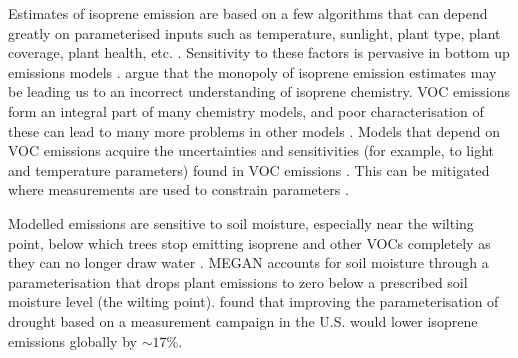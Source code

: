       Estimates of isoprene emission are based on a few algorithms that can depend greatly on parameterised inputs such as temperature, sunlight, plant type, plant coverage, plant health, etc. \parencite{Arneth2008,Niinemets2010}.
      Sensitivity to these factors is pervasive in bottom up emissions models 
      \parencite[e.g.,][]{Marais2014,Miller2014,Messina2016}.
      \textcite{Arneth2008} argue that the monopoly of isoprene emission estimates may be leading us to an incorrect understanding of isoprene chemistry.
      VOC emissions form an integral part of many chemistry models, and poor characterisation of these can lead to many more problems in other models \parencite[e.g.,]{Yue2015}.
      Models that depend on VOC emissions acquire the uncertainties and sensitivities (for example, to light and temperature parameters) found in VOC emissions \parencite{Yue2015}.
      This can be mitigated where measurements are used to constrain parameters \parencite[e.g.,][]{Stavrakou2014}.
     
      Modelled emissions are sensitive to soil moisture, especially near the wilting point, below which trees stop emitting isoprene and other VOCs completely as they can no longer draw water \parencite{Bauwens2016}.
      MEGAN accounts for soil moisture through a parameterisation that drops plant emissions to zero below a prescribed soil moisture level (the wilting point).
      \textcite{Jiang2018} found that improving the parameterisation of drought based on a measurement campaign in the U.S. would lower isoprene emissions globally by $\sim17\%$.
      
